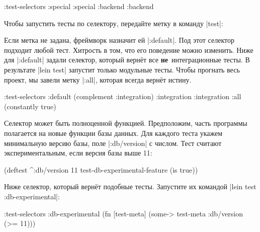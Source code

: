 \begin{english}
  \begin{clojure}
:test-selectors {:special :special
                 :backend :backend}
  \end{clojure}
\end{english}

\noindent
Чтобы запустить тесты по селектору, передайте метку в команду \spverb|test|:

\begin{english}
\end{english}


Если метка не задана, фреймворк назначит ей \spverb|:default|. Под этот селектор
подходит любой тест. Хитрость в том, что его поведение можно изменить. Ниже для
\spverb|:default| задали селектор, который верн\"{е}т все \textbf{не}~интеграционные
тесты. В результате \spverb|lein test| запустит только модульные тесты. Чтобы
прогнать весь проект, мы завели метку \spverb|:all|, которая всегда верн\"{е}т
истину.

\begin{english}
  \begin{clojure}
:test-selectors {:default (complement :integration)
                 :integration :integration
                 :all (constantly true)}
  \end{clojure}
\end{english}

Селектор может быть полноценной функцией. Предположим, часть программы
полагается на новые функции базы данных. Для каждого теста укажем минимальную
версию базы, поле \spverb|:db/version| с числом. Тест считают экспериментальным,
если версия базы выше 11:

\begin{english}
  \begin{clojure}
(deftest ^{:db/version 11}
  test-db-experimental-feature
  (is true))
  \end{clojure}
\end{english}

\noindent
Ниже селектор, который верн\"{е}т подобные тесты. Запустите их командой
\spverb|lein test :db-experimental|:

\begin{english}
  \begin{clojure}
:test-selectors
{:db-experimental
 (fn [test-meta]
   (some-> test-meta :db/version (>= 11)))}
  \end{clojure}
\end{english}

